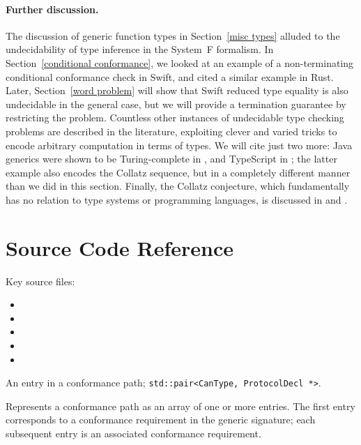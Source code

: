 \documentclass[../generics]{subfiles}
\begin{document}
\paragraph{Further discussion.}
The discussion of generic function types in Section~\ref{misc types} alluded to the undecidability of type inference in the System~F formalism. In Section~\ref{conditional conformance}, we looked at an example of a non-terminating conditional conformance check in Swift, and cited a similar example in Rust. Later, Section~\ref{word problem} will show that Swift reduced type equality is also undecidable in the general case, but we will provide a termination guarantee by restricting the problem. Countless other instances of undecidable type checking problems are described in the literature, exploiting clever and varied tricks to encode arbitrary computation in terms of types. We will cite just two more: Java generics were shown to be Turing-complete in \cite{java_undecidable}, and TypeScript in \cite{tscollatz}; the latter example also encodes the Collatz sequence, but in a completely different manner than we did in this section. Finally, the Collatz conjecture, which fundamentally has no relation to type systems or programming languages, is discussed in \cite{collatzbook} and \cite{wolframtag}.

\section{Source Code Reference}

Key source files:
\begin{itemize}
\item {}
\item {}
\item {}
\item {}
\item {}
\end{itemize}

An entry in a conformance path; \verb|std::pair<CanType, ProtocolDecl *>|.

Represents a conformance path as an array of one or more entries. The first entry corresponds to a conformance requirement in the generic signature; each subsequent entry is an associated conformance requirement.
\end{document}
